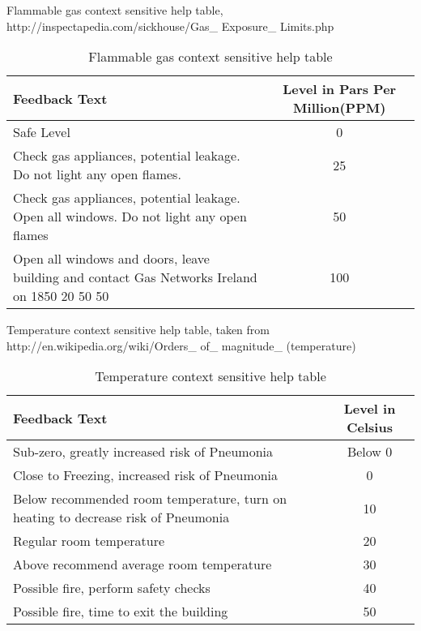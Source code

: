 \documentclass{article}
\begin{document}
\newpage
\noindent
Flammable gas context sensitive help table, http://inspectapedia.com/sickhouse/Gas\_ Exposure\_ Limits.php

\begin{table}[H]
\def\arraystretch{2}%
\begin{center}
 \begin{tabular}{|| L{8cm} | c ||} 
 \hline
 \textbf{Feedback Text} & \textbf{Level in Pars Per Million(PPM)}  \\ [0.5ex] 
 \hline\hline
 Safe Level & 0 \\ 
 \hline
 Check gas appliances, potential leakage. Do not light any open flames. & 25 \\
 \hline
 Check gas appliances, potential leakage. Open all windows. Do not light any open flames & 50 \\
 \hline
 Open all windows and doors, leave building and contact Gas Networks Ireland on 1850 20 50 50 & 100 \\ [1ex] 
 \hline
\end{tabular}
\end{center}
\caption{Flammable gas context sensitive help table}
\label{table:testing_op_timings}
\end{table}

\noindent
Temperature context sensitive help table, taken from http://en.wikipedia.org/wiki/Orders\_ of\_ magnitude\_ (temperature)

\begin{table}[H]
\def\arraystretch{2}%
\begin{center}
 \begin{tabular}{|| L{8cm} | c ||} 
 \hline
 \textbf{Feedback Text} & \textbf{Level in Celsius}  \\ [0.5ex] 
 \hline\hline
 Sub-zero, greatly increased risk of Pneumonia & Below 0 \\ 
 \hline
 Close to Freezing, increased risk of Pneumonia & 0 \\
 \hline
 Below recommended room temperature, turn on heating to decrease risk of Pneumonia & 10 \\
 \hline
 Regular room temperature & 20 \\ [1ex] 
 \hline
 Above recommend average room temperature & 30 \\ [1ex] 
 \hline
 Possible fire, perform safety checks & 40 \\ [1ex] 
 \hline
 Possible fire, time to exit the building & 50 \\ [1ex] 
 \hline
\end{tabular}
\end{center}
\caption{Temperature context sensitive help table}
\label{table:testing_op_timings}
\end{table}
\end{document}
